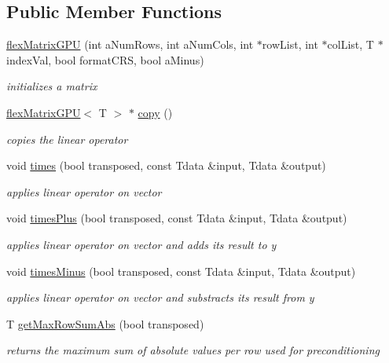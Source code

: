 \subsection*{Public Member Functions}
\begin{DoxyCompactItemize}
\item 
\hyperlink{classflex_matrix_g_p_u_a8fb0c0049604ddd6c51d39e1e96781f6}{flex\+Matrix\+G\+PU} (int a\+Num\+Rows, int a\+Num\+Cols, int $\ast$row\+List, int $\ast$col\+List, T $\ast$index\+Val, bool format\+C\+RS, bool a\+Minus)
\begin{DoxyCompactList}\small\item\em initializes a matrix \end{DoxyCompactList}\item 
\hyperlink{classflex_matrix_g_p_u}{flex\+Matrix\+G\+PU}$<$ T $>$ $\ast$ \hyperlink{classflex_matrix_g_p_u_a4df27ef284eec123ba72f1b5788f1180}{copy} ()
\begin{DoxyCompactList}\small\item\em copies the linear operator \end{DoxyCompactList}\item 
void \hyperlink{classflex_matrix_g_p_u_a059adf49cc4d895d017eed28462a29e4}{times} (bool transposed, const Tdata \&input, Tdata \&output)
\begin{DoxyCompactList}\small\item\em applies linear operator on vector \end{DoxyCompactList}\item 
void \hyperlink{classflex_matrix_g_p_u_adbb111427c3bc8ef6157ba60b3dbea3d}{times\+Plus} (bool transposed, const Tdata \&input, Tdata \&output)
\begin{DoxyCompactList}\small\item\em applies linear operator on vector and adds its result to y \end{DoxyCompactList}\item 
void \hyperlink{classflex_matrix_g_p_u_a4d6b328bba4170827a1ead228ecd8fcb}{times\+Minus} (bool transposed, const Tdata \&input, Tdata \&output)
\begin{DoxyCompactList}\small\item\em applies linear operator on vector and substracts its result from y \end{DoxyCompactList}\item 
T \hyperlink{classflex_matrix_g_p_u_aae4f81a403b6fff8ac73ccdf6c21399f}{get\+Max\+Row\+Sum\+Abs} (bool transposed)
\begin{DoxyCompactList}\small\item\em returns the maximum sum of absolute values per row used for preconditioning \end{DoxyCompactList}\item 

\end{DoxyCompactItemize}
